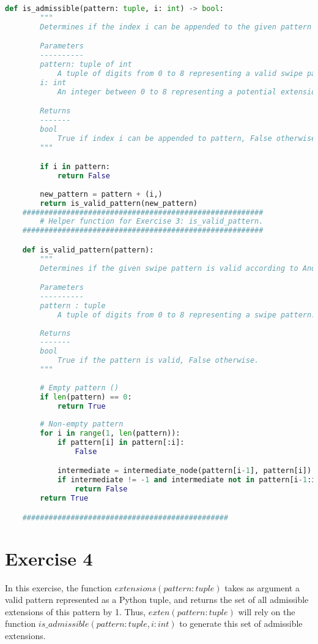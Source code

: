 \documentclass[12pt]{article}
\theoremstyle{definition}
\begin{document}
\begin{lstlisting}[language=Python, caption=Exercise 3]
    def is_admissible(pattern: tuple, i: int) -> bool:
        """
        Determines if the index i can be appended to the given pattern

        Parameters
        ----------
        pattern: tuple of int
            A tuple of digits from 0 to 8 representing a valid swipe pattern
        i: int
            An integer between 0 to 8 representing a potential extension node.

        Returns
        -------
        bool
            True if index i can be appended to pattern, False otherwise.
        """

        if i in pattern:
            return False
        
        new_pattern = pattern + (i,)
        return is_valid_pattern(new_pattern)
    #######################################################
        # Helper function for Exercise 3: is_valid_pattern.
    #######################################################

    def is_valid_pattern(pattern): 
        """ 
        Determines if the given swipe pattern is valid according to Android pattern rules. 

        Parameters 
        ---------- 
        pattern : tuple 
            A tuple of digits from 0 to 8 representing a swipe pattern. 
            
        Returns 
        ------- 
        bool 
            True if the pattern is valid, False otherwise. 
        """ 
        
        # Empty pattern ()
        if len(pattern) == 0: 
            return True 
        
        # Non-empty pattern
        for i in range(1, len(pattern)): 
            if pattern[i] in pattern[:i]:
                False

            intermediate = intermediate_node(pattern[i-1], pattern[i])         
            if intermediate != -1 and intermediate not in pattern[i-1:i+1]: 
                return False 
        return True

    ###############################################
\end{lstlisting}

\section*{Exercise 4}
In this exercise, the function $extensions(pattern: tuple)$ takes as argument a valid pattern represented as a Python tuple, and returns the set of all admissible extensions of this pattern by 1.
Thus, $exten(pattern: tuple)$ will rely on the function $is\_admissible(pattern: tuple, i: int)$ to generate this set of admissible extensions.
\end{document}
